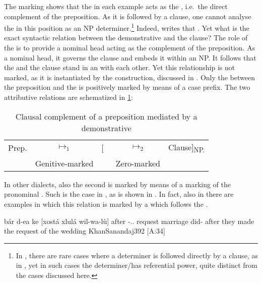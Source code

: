 The \gen* marking shows that the  in each example acts as the \secn, i.e.\ the direct complement of the preposition. As it is followed by a clause, one cannot analyse the \dem* in this position as an NP determiner.\footnote{In \JZax, there are rare cases where a determiner is followed directly by a clause, as in , yet in such cases the determiner/\dem* has referential power, quite distinct from the cases discussed here.} Indeed, \citet[392]{KhanSanandaj} writes that . Yet  what is the exact syntactic relation between the demonstrative and the clause? The role of the \dem* is to provide a nominal head acting as the complement of the preposition. As a nominal head, it governs the   clause and embeds it within an NP. It
 follows that the  and  the clause stand in an  with each other. Yet  this relationship is not marked, as it is instantiated by the  construction, discussed in . Only the  between the preposition and the \dem* is positively  marked  by means of a \gen* case prefix. The two attributive relations are schematized in \ref{tb:JSan_prep_clause}: 

\begin{table}[h!]
\centering
\begin{tabular}{ccccc}
\toprule
Prep. & $\mapsto_1$ 		& [\dem\ & $\mapsto_2$ & Clause]\textsubscript{NP.\gen} \\
	  & Genitive-marked		&		 & Zero-marked &								\\
\bottomrule
\end{tabular}
\caption{Clausal complement of a preposition mediated by a demonstrative} \label{tb:JSan_prep_clause}
\end{table}

In other dialects, also the second  is  marked by means of a \cst* marking of the pronominal \prim. Such is the case in \JUrm, as is shown in . In fact, also in \JSan there are examples in which this relation is marked by a \rel* which follows the . 

{bár\cb{} d-ea ke\cb{} [xostá xlulá wil-wa-lù]}
{after\cb{} \gen-\dem.\near.\sg{} \rel\cb{} request marriage did-\pl}
{after they made the request of the wedding}
{KhanSanandaj}{392 {[A:34]}}

